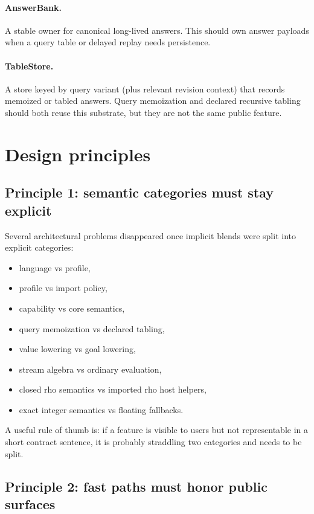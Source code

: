 \documentclass[11pt]{article}
\begin{document}
\paragraph{AnswerBank.} A stable owner for canonical long-lived answers. This should own answer payloads when a query table or delayed replay needs persistence.

\paragraph{TableStore.} A store keyed by query variant (plus relevant revision context) that records memoized or tabled answers. Query memoization and declared recursive tabling should both reuse this substrate, but they are not the same public feature.

\section{Design principles}

\subsection{Principle 1: semantic categories must stay explicit}

Several architectural problems disappeared once implicit blends were split into explicit categories:
\begin{itemize}
    \item language vs profile,
    \item profile vs import policy,
    \item capability vs core semantics,
    \item query memoization vs declared tabling,
    \item value lowering vs goal lowering,
    \item stream algebra vs ordinary evaluation,
    \item closed rho semantics vs imported rho host helpers,
    \item exact integer semantics vs floating fallbacks.
\end{itemize}

A useful rule of thumb is: if a feature is visible to users but not representable in a short contract sentence, it is probably straddling two categories and needs to be split.

\subsection{Principle 2: fast paths must honor public surfaces}
\end{document}
